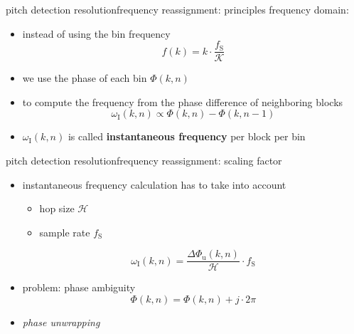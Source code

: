         \begin{frame}{pitch detection resolution}{frequency reassignment: principles}
            frequency domain:
            \begin{itemize}
                \item   instead of using the bin frequency
                    \[ f(k) = k\cdot\frac{f_\mathrm{S}}{\mathcal{K}}\]
                \item   we use the phase of each bin $\Phi(k,n)$
                \item   to compute the frequency from the phase difference of neighboring blocks
                    \begin{equation*}\label{eq:phasediff}
                        \omega_{\mathrm{I}}(k,n)	\propto \Phi(k,n)-\Phi(k,n-1)
                    \end{equation*}
                \item<2->   $\omega_{\mathrm{I}}(k,n)$ is called \textbf{instantaneous frequency} per block per bin
            \end{itemize}
        \end{frame}
        \begin{frame}{pitch detection resolution}{frequency reassignment: scaling factor}
            \begin{itemize}
                \item instantaneous frequency calculation has to take into account
                    \begin{itemize}
                        \item   hop size $\mathcal{H}$
                        \item   sample rate $f_\mathrm{S}$
                    \end{itemize}
                
                    \begin{equation*}
                        \omega_{\mathrm{I}}(k,n) = \frac{\Delta\Phi_{\mathrm{u}}(k,n)}{\mathcal{H}}\cdot f_{\mathrm{S}} 
                    \end{equation*}
                \item<1-> problem: phase ambiguity
                    \begin{equation*}
                        \Phi(k,n) = \Phi(k,n) + j\cdot 2\pi
                    \end{equation*}
                \item<2->[$\Rightarrow$] \textit{phase unwrapping}
            \end{itemize}
        \end{frame}
